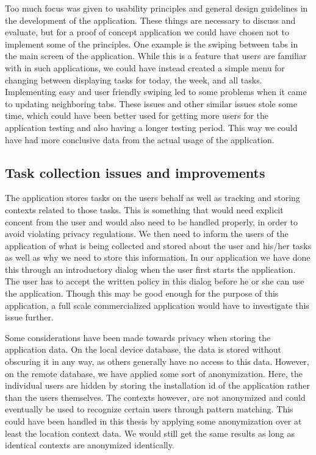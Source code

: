 Too much focus was given to usability principles and general design guidelines in the development of the application. These things are necessary to discuss and evaluate, but for a proof of concept application we could have chosen not to implement some of the principles. One example is the swiping between tabs in the main screen of the application. While this is a feature that users are familiar with in such applications, we could have instead created a simple menu for changing between displaying tasks for today, the week, and all tasks. Implementing easy and user friendly swiping led to some problems when it came to updating neighboring tabs. These issues and other similar issues stole some time, which could have been better used for getting more users for the application testing and also having a longer testing period. This way we could have had more conclusive data from the actual usage of the application.



\subsection{Task collection issues and improvements}

The application stores tasks on the users behalf as well as tracking and storing contexts related to those tasks. This is something that would need explicit concent from the user and would also need to be handled properly, in order to avoid violating privacy regulations. We then need to inform the users of the application of what is being collected and stored about the user and his/her tasks as well as why we need to store this information. In our application we have done this through an introductory dialog when the user first starts the application. The user has to accept the written policy in this dialog before he or she can use the application. Though this may be good enough for the purpose of this application, a full scale commercialized application would have to investigate this issue further.

Some considerations have been made towards privacy when storing the application data. On the local device database, the data is stored without obscuring it in any way, as others generally have no access to this data. However, on the remote database, we have applied some sort of anonymization. Here, the individual users are hidden by storing the installation id of the application rather than the users themselves. The contexts however, are not anonymized and could eventually be used to recognize certain users through pattern matching. This could have been handled in this thesis by applying some anonymization over at least the location context data. We would still get the same results as long as identical contexts are anonymized identically.

